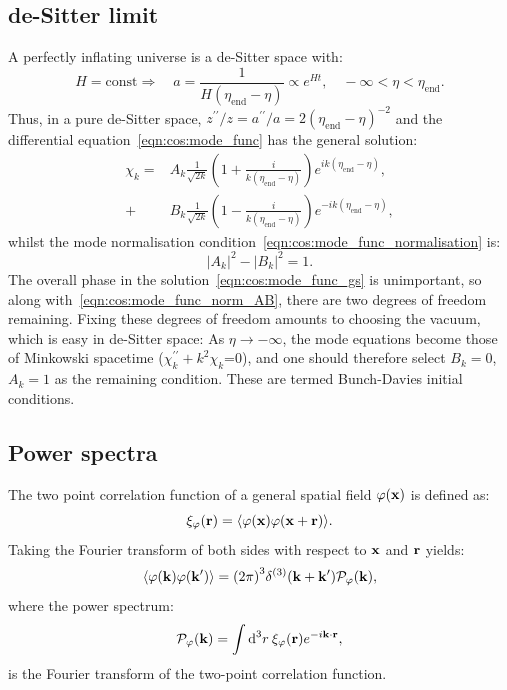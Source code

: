 \subsection{de-Sitter limit}
A perfectly inflating universe is a de-Sitter space with:
\begin{equation}
  H=\text{const}\Rightarrow \quad a = \frac{1}{H(\eta_\mathrm{end}-\eta)} \propto e^{Ht}, \quad -\infty<\eta<\eta_\mathrm{end}.
  \label{eqn:cos:de-sitter}
\end{equation}
Thus, in a pure de-Sitter space, ${z^{\prime\prime}/z = a^{\prime\prime}/a= 2{(\eta_\mathrm{end}-\eta)}^{-2}}$ and the differential equation~\eqref{eqn:cos:mode_func} has the general solution:
\begin{align}
  \chi_k = &A_k \frac{1}{\sqrt{2k}}\left( 1+\frac{i}{k(\eta_\mathrm{end}-\eta)} \right)e^{ik(\eta_\mathrm{end}-\eta)}, \nonumber\\
  + &B_k \frac{1}{\sqrt{2k}}\left( 1-\frac{i}{k(\eta_\mathrm{end}-\eta)} \right)e^{-ik(\eta_\mathrm{end}-\eta)},
  \label{eqn:cos:mode_func_gs}
\end{align}
whilst the mode normalisation condition~\eqref{eqn:cos:mode_func_normalisation} is:
\begin{equation}
  |A_k|^2 - |B_k|^2 = 1.
  \label{eqn:cos:mode_func_norm_AB}
\end{equation}
The overall phase in the solution~\eqref{eqn:cos:mode_func_gs} is unimportant, so along with~\eqref{eqn:cos:mode_func_norm_AB}, there are two degrees of freedom remaining. Fixing these degrees of freedom amounts to choosing the vacuum, which is easy in de-Sitter space: As $\eta\rightarrow -\infty$, the mode equations become those of Minkowski spacetime ($\chi_k^{\prime\prime} +k^2 \chi_k$=0), and one should therefore select $B_k=0$, $A_k=1$ as the remaining condition. These are termed Bunch-Davies initial conditions.

\subsection{Power spectra}
The two point correlation function of a general spatial field $\varphi(\vx)$ is defined as:
\begin{equation}
  \xi_\varphi(\vr) = \mean{\varphi(\vx)\varphi(\vx + \vr)}.
\end{equation}
Taking the Fourier transform of both sides with respect to $\vx$ and $\vr$ yields:
\begin{equation}
  \mean{\varphi(\vk)\varphi(\vk^{\prime})} = {\left( 2\pi \right)}^3\delta^{(3)}(\vk + \vk^{\prime}) \mathcal{P}_\varphi(\vk),
  \label{eqn:cos:power_spectrum_definition}
\end{equation}
where the power spectrum:
\begin{equation}
  \mathcal{P}_\varphi(\vk) = \int \d[3]{r}\: \xi_\varphi(\vr)e^{-i\vk\cdot\vr},
\end{equation}
is the Fourier transform of the two-point correlation function.

